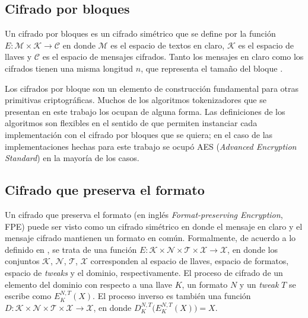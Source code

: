 \subsection{Cifrado por bloques}

Un cifrado por bloques es un cifrado simétrico que se define por la función $ E:
\mathcal{M} \times \mathcal{K} \rightarrow \mathcal{C} $ en donde $ \mathcal{M} $
es el espacio de textos en claro, $ \mathcal{K} $ es el espacio de llaves y $
\mathcal{C} $ es el espacio de mensajes cifrados. Tanto los mensajes en claro
como los cifrados tienen una misma longitud $ n $, que representa el tamaño del
bloque \cite{menezes}.

Los cifrados por bloque son un elemento de construcción fundamental para otras
primitivas criptográficas. Muchos de los algoritmos tokenizadores que se
presentan en este trabajo los ocupan de alguna forma. Las definiciones de los
algoritmos son flexibles en el sentido de que permiten instanciar cada
implementación con el cifrado por bloques que se quiera; en el caso de las
implementaciones hechas para este trabajo se ocupó AES (\textit{Advanced
Encryption Standard}) en la mayoría de los casos.

\subsection{Cifrado que preserva el formato}



Un cifrado que preserva el formato (en inglés \textit{Format-preserving
Encryption}, FPE) puede ser visto como un cifrado simétrico en donde el mensaje
en claro y el mensaje cifrado mantienen un formato en común. Formalmente, de
acuerdo a lo definido en \cite{DBLP:conf/sacrypt/BellareRRS09}, se trata de una
función $ E: \mathcal{K} \times \mathcal{N} \times \mathcal{T} \times
\mathcal{X} \rightarrow \mathcal{X} $, en donde los conjuntos $ \mathcal{K} $, $
\mathcal{N} $, $ \mathcal{T} $, $ \mathcal{X} $ corresponden al espacio de
llaves, espacio de formatos, espacio de \textit{tweaks} y el dominio,
respectivamente. El proceso de cifrado de un elemento del dominio con respecto a
una llave $ K $, un formato $ N $ y un \textit{tweak} $ T $ se escribe como  $
E_K^{N,T}(X) $. El proceso inverso es también una función $ D: \mathcal{K}
\times \mathcal{N} \times \mathcal{T} \times \mathcal{X} \rightarrow \mathcal{X}
$, en donde $ D_K^{N,T}\big( E_K^{N,T}(X) \big) = X $.

